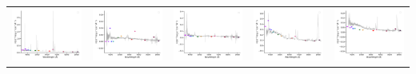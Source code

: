 \begin{center}
\begin{longtable}{l l l l l }
    \includegraphics[width=0.19\linewidth, clip]{Figs/Figs-sdss/spec-6780-56267-0244-STRIPE82-0053-009665.pdf} & \includegraphics[width=0.19\linewidth, clip]{Figs/Figs-sdss/spec-6780-56577-0280-STRIPE82-0053-044359.pdf} & \includegraphics[width=0.19\linewidth, clip]{Figs/Figs-sdss/spec-6781-56274-0268-STRIPE82-0057-039669.pdf} & \includegraphics[width=0.19\linewidth, clip]{Figs/Figs-sdss/spec-6781-56274-0387-STRIPE82-0055-012470.pdf} & \includegraphics[width=0.19\linewidth, clip]{Figs/Figs-sdss/spec-6781-56274-0507-STRIPE82-0056-011736.pdf} \\

\end{longtable}
\end{center}
